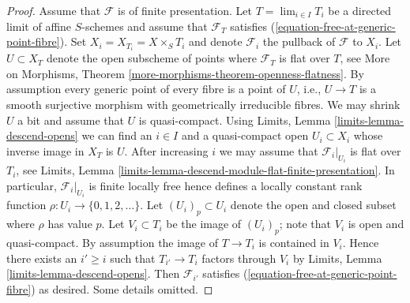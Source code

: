 \documentclass[10pt,a4paper]{amsart}
\theoremstyle{plain}
\theoremstyle{definition}
\theoremstyle{remark}
\numberwithin{equation}{subsection}
\def\lim{\mathop{\mathrm{lim}}\nolimits}
\begin{document}
\begin{proof}
\medskip\noindent
Assume that $\mathcal{F}$ is of finite presentation.
Let $T = \lim_{i \in I} T_i$ be a directed limit of affine $S$-schemes
and assume that $\mathcal{F}_T$ satisfies
(\ref{equation-free-at-generic-point-fibre}).
Set $X_i = X_{T_i} = X \times_S T_i$ and denote $\mathcal{F}_i$ the
pullback of $\mathcal{F}$ to $X_i$.
Let $U \subset X_T$ denote the open subscheme of points where
$\mathcal{F}_T$ is flat over $T$, see
More on Morphisms, Theorem \ref{more-morphisms-theorem-openness-flatness}.
By assumption every generic point of every fibre is a point of $U$, i.e.,
$U \to T$ is a smooth surjective morphism with geometrically irreducible
fibres. We may shrink $U$ a bit and assume that $U$ is quasi-compact.
Using
Limits, Lemma \ref{limits-lemma-descend-opens}
we can find an $i \in I$ and a quasi-compact open $U_i \subset X_i$
whose inverse image in $X_T$ is $U$. After increasing $i$ we may
assume that $\mathcal{F}_i|_{U_i}$ is flat over $T_i$, see
Limits, Lemma \ref{limits-lemma-descend-module-flat-finite-presentation}.
In particular, $\mathcal{F}_i|_{U_i}$ is finite locally free
hence defines a locally constant
rank function $\rho : U_i \to \{0, 1, 2, \ldots \}$.
Let $(U_i)_p \subset U_i$ denote the open and closed
subset where $\rho$ has value $p$. Let $V_i \subset T_i$ be the
image of $(U_i)_p$; note that $V_i$ is open and quasi-compact.
By assumption the image of $T \to T_i$ is contained in $V_i$.
Hence there exists an $i' \geq i$ such that $T_{i'} \to T_i$ factors
through $V_i$ by
Limits, Lemma \ref{limits-lemma-descend-opens}.
Then $\mathcal{F}_{i'}$ satisfies (\ref{equation-free-at-generic-point-fibre})
as desired. Some details omitted.
\end{proof}
\end{document}
